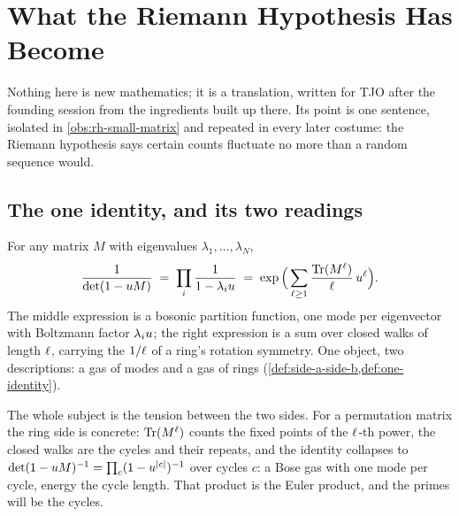
\section{What the Riemann Hypothesis Has Become}
\label{sec:what-rh}

Nothing here is new mathematics; it is a translation, written for TJO after the
founding session from the ingredients built up there. Its point is one sentence,
isolated in \cref{obs:rh-small-matrix} and repeated in every later costume: the
Riemann hypothesis says certain counts fluctuate no more than a random sequence would.

\subsection{The one identity, and its two readings}

\begin{observation}
\label{obs:one-identity}
For any matrix $M$ with eigenvalues $\lambda_1,\dots,\lambda_N$,
\[
\frac{1}{\det(1-u M)} \;=\; \prod_i\frac1{1-\lambda_iu}
\;=\; \exp\Big(\sum_{\ell\ge1}\frac{\operatorname{Tr}(M^{\ell})}{\ell}\,u^{\ell}\Big).
\]
The middle expression is a bosonic partition function, one mode per eigenvector with
Boltzmann factor $\lambda_iu$; the right expression is a sum over closed walks of
length $\ell$, carrying the $1/\ell$ of a ring's rotation symmetry. One object, two
descriptions: a gas of modes and a gas of rings
(\cref{def:side-a-side-b,def:one-identity}).
\end{observation}

The whole subject is the tension between the two sides. For a permutation matrix the
ring side is concrete: $\operatorname{Tr}(M^{\ell})$ counts the fixed points of the $\ell$-th power,
the closed walks are the cycles and their repeats, and the identity
collapses to $\det(1-u M)^{-1} = \prod_{c}(1-u^{|c|})^{-1}$ over cycles $c$: a
Bose gas with one mode per cycle, energy the cycle length. That product is the Euler
product, and the primes will be the cycles.


